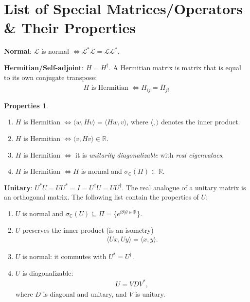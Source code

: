 \documentclass{article}
\theoremstyle{definition}
\newtheorem{prop}{Properties}[section]
\newcommand{\R}{\mathbb{R}}
\newcommand{\C}{\mathbb{C}}
\newcommand{\lag}{\mathcal{L}}
\begin{document}
\section{List of Special Matrices/Operators \& Their Properties}
\begin{enumerate}
	\item \textbf{Normal}: $\lag$ is normal $\iff \lag^*\lag = \lag\lag^*$.    
	
	\item \textbf{Hermitian/Self-adjoint}: $H = H^\dagger$. A Hermitian matrix is matrix that is equal to its own conjugate transpose:
	\begin{align*}
	H \text{ is Hermitian } \iff H_{ij} = \bar{H}_{ji}
	\end{align*} 
	\begin{prop}
	$\,$
	\begin{enumerate}
		\item $H$ is Hermitian $ \iff \langle w, Hv\rangle = \langle Hw, v \rangle$, where $\langle, \rangle$ denotes the inner product.
		\item $H$ is Hermitian $ \iff \langle v, Hv\rangle \in \R$.
		\item $H$ is Hermitian $\iff$ it is \textit{unitarily diagonalizable} with \textit{real eigenvalues}.
		\item $H$ is Hermitian $\iff H$ is normal and $ \sigma_\C (H) \subset \R$.
	\end{enumerate}
	\item \textbf{Unitary}: $U^*U = UU^* = I = U^\dagger U = UU^\dagger$. The real analogue of a unitary matrix is an orthogonal matrix. The following list contain the properties of $U$:
	\begin{enumerate}
		
		\item $U$ is normal and $\sigma_\C(U) \subseteq \Pi = \{ e^{i\theta \vert \theta \in \R} \}$.
		
		\item $U$ preserves the inner product (is an isometry)
		\begin{align*}
		\langle Ux, Uy \rangle = \langle x,y\rangle.
		\end{align*}
		
		\item $U$ is normal: it commutes with $U^* = U^\dagger$.
		
		\item $U$ is diagonalizable:
		\begin{align*}
		U = VDV^*,
		\end{align*}
		where $D$ is diagonal and unitary, and $V$ is unitary.
		

\end{enumerate}
\end{prop}
\end{enumerate}
\end{document}
